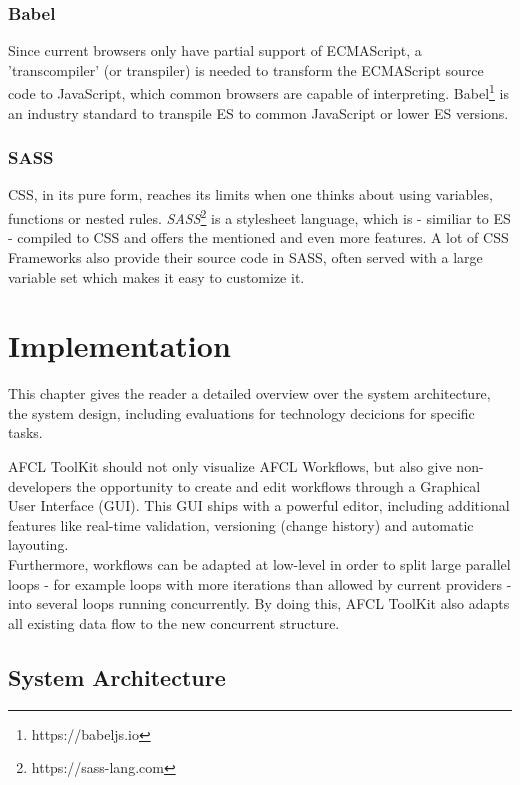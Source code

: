 \documentclass[a4paper,12pt,pdftex,halfparskip,cleardoubleempty,bibtotoc,liststotoc]{scrbook}
\begin{document}
\subsection{Babel}
Since current browsers only have partial support of ECMAScript, a 'transcompiler' (or transpiler) is needed to transform the ECMAScript source code to JavaScript, which common browsers are capable of interpreting.
Babel\footnote{https://babeljs.io} is an industry standard to transpile ES to common JavaScript or lower ES versions.

\subsection{SASS}

CSS, in its pure form, reaches its limits when one thinks about using variables, functions or nested rules. \textit{SASS}\footnote{https://sass-lang.com} is a stylesheet language, which is - similiar to ES - compiled to CSS and offers the mentioned and even more features.
A lot of CSS Frameworks also provide their source code in SASS, often served with a large variable set which makes it easy to customize it.

\chapter{Implementation}

This chapter gives the reader a detailed overview over the system architecture, the system design, including evaluations for technology decicions for specific tasks.

AFCL ToolKit should not only visualize AFCL Workflows, but also give non-developers the opportunity to create and edit workflows through a Graphical User Interface (GUI). This GUI ships with a powerful editor, including additional features like real-time validation, versioning (change history) and automatic layouting.\\
Furthermore, workflows can be adapted at low-level in order to split large parallel loops - for example loops with more iterations than allowed by current providers - into several loops running concurrently. By doing this, AFCL ToolKit also adapts  all existing data flow to the new concurrent structure.

\section{System Architecture}
\end{document}

